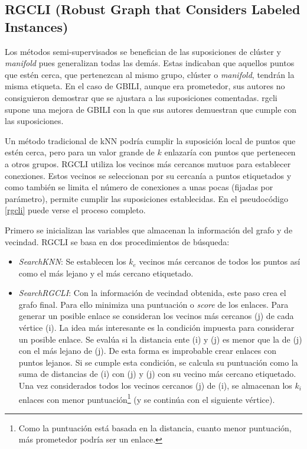 \subsection{RGCLI (Robust Graph that Considers Labeled Instances)}
\label{teoria-rgcli}

Los métodos semi-supervisados se benefician de las suposiciones de clúster y \textit{manifold} pues generalizan todas las demás. Estas indicaban que aquellos puntos que estén cerca, que pertenezcan al mismo grupo, clúster o \textit{manifold}, tendrán la misma etiqueta. En el caso de GBILI, aunque era prometedor, sus autores no consiguieron demostrar que se ajustara a las suposiciones comentadas. \Gls{rgcli} \cite{berton2017rgcli} supone una mejora de GBILI con la que sus autores demuestran que cumple con las suposiciones. 

Un método tradicional de kNN podría cumplir la suposición local de puntos que estén cerca, pero para un valor grande de $k$ enlazaría con puntos que pertenecen a otros grupos. RGCLI utiliza los vecinos más cercanos mutuos para establecer conexiones. Estos vecinos se seleccionan por su cercanía a puntos etiquetados y como también se limita el número de conexiones a unas pocas (fijadas por parámetro), permite cumplir las suposiciones establecidas. En el pseudocódigo \ref{rgcli} puede verse el proceso completo.



Primero se inicializan las variables que almacenan la información del grafo y de vecindad. RGCLI se basa en dos procedimientos de búsqueda:
\begin{itemize}
    \item \textit{SearchKNN}: Se establecen los $k_e$ vecinos más cercanos de todos los puntos así como el más lejano y el más cercano etiquetado.
    \item \textit{SearchRGCLI}: Con la información de vecindad obtenida, este paso crea el grafo final. Para ello minimiza una puntuación o \textit{score} de los enlaces. Para generar un posible enlace se consideran los vecinos más cercanos (j) de cada vértice (i). 
La idea más interesante es la condición impuesta para considerar un posible enlace. Se evalúa si la distancia ente (i) y (j) es menor que la de (j) con el más lejano de (j). De esta forma es improbable crear enlaces con puntos lejanos. Si se cumple esta condición, se calcula su puntuación como la suma de distancias de (i) con (j) y (j) con su vecino más cercano etiquetado. Una vez considerados todos los vecinos cercanos (j) de (i), se almacenan los $k_i$ enlaces con menor puntuación\footnote{Como la puntuación está basada en la distancia, cuanto menor puntuación, más prometedor podría ser un enlace.} (y se continúa con el siguiente vértice).
\end{itemize}

